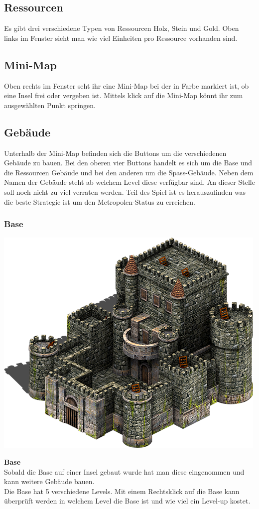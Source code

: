 \documentclass{scrartcl}
\begin{document}
\subsection{Ressourcen}
Es gibt drei verschiedene Typen von Ressourcen Holz, Stein und Gold. Oben links im Fenster sieht man wie viel Einheiten pro Ressource vorhanden sind. 
\subsection{Mini-Map}
Oben rechts im Fenster seht ihr eine Mini-Map bei der in Farbe markiert ist, ob eine Insel frei oder vergeben ist. Mittels klick auf die Mini-Map könnt ihr zum ausgewählten Punkt springen.
\subsection{Gebäude}
Unterhalb der Mini-Map befinden sich die Buttons um die verschiedenen Gebäude zu bauen. Bei den oberen vier Buttons handelt es sich um die Base und die Ressourcen Gebäude und bei den anderen um die Spass-Gebäude. Neben dem Namen der Gebäude steht ab welchem Level diese verfügbar sind.
An dieser Stelle soll noch nicht zu viel verraten werden. Teil des Spiel ist es herauszufinden was die beste Strategie ist um den Metropolen-Status zu erreichen. 
\subsubsection{Base}
\begin{minipage}{0.3\textwidth}
	\includegraphics[width=\textwidth]{imgBase.png}
\end{minipage}
\hfill
\begin{minipage}{0.5\textwidth}
	\textbf{Base} \\
	Sobald die Base auf einer Insel gebaut wurde hat man diese eingenommen und kann weitere Gebäude bauen.\\

	Die Base hat 5 verschiedene Levels. Mit einem Rechtsklick auf die Base kann überprüft werden in welchem Level die Base ist und wie viel ein Level-up kostet.\\
	
\end{minipage}
\end{document}
